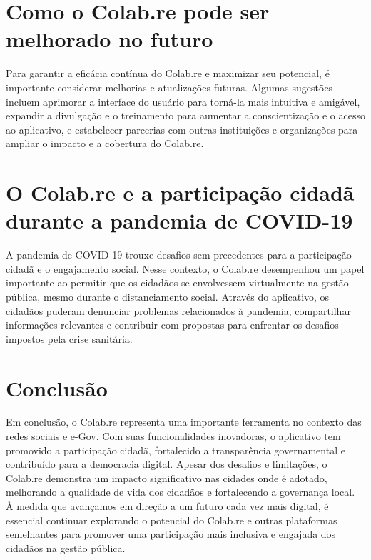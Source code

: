 \section*{Como o Colab.re pode ser melhorado no futuro}
Para garantir a eficácia contínua do Colab.re e maximizar seu potencial, é importante considerar melhorias e atualizações futuras. Algumas sugestões incluem aprimorar a interface do usuário para torná-la mais intuitiva e amigável, expandir a divulgação e o treinamento para aumentar a conscientização e o acesso ao aplicativo, e estabelecer parcerias com outras instituições e organizações para ampliar o impacto e a cobertura do Colab.re.

\section*{O Colab.re e a participação cidadã durante a pandemia de COVID-19}
A pandemia de COVID-19 trouxe desafios sem precedentes para a participação cidadã e o engajamento social. Nesse contexto, o Colab.re desempenhou um papel importante ao permitir que os cidadãos se envolvessem virtualmente na gestão pública, mesmo durante o distanciamento social. Através do aplicativo, os cidadãos puderam denunciar problemas relacionados à pandemia, compartilhar informações relevantes e contribuir com propostas para enfrentar os desafios impostos pela crise sanitária.

\section*{Conclusão}
Em conclusão, o Colab.re representa uma importante ferramenta no contexto das redes sociais e e-Gov. Com suas funcionalidades inovadoras, o aplicativo tem promovido a participação cidadã, fortalecido a transparência governamental e contribuído para a democracia digital. Apesar dos desafios e limitações, o Colab.re demonstra um impacto significativo nas cidades onde é adotado, melhorando a qualidade de vida dos cidadãos e fortalecendo a governança local. À medida que avançamos em direção a um futuro cada vez mais digital, é essencial continuar explorando o potencial do Colab.re e outras plataformas semelhantes para promover uma participação mais inclusiva e engajada dos cidadãos na gestão pública.